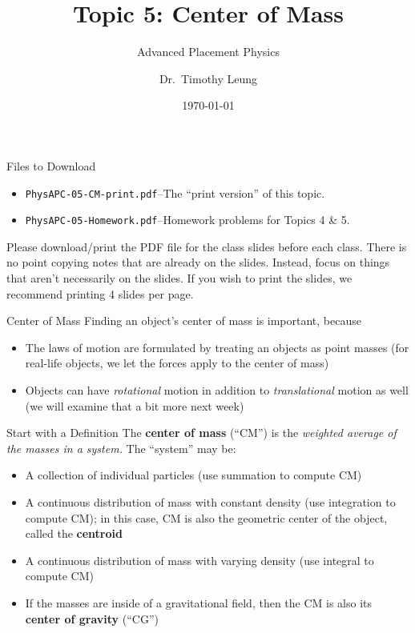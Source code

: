 \documentclass[12pt,compress,aspectratio=169]{beamer}
\title{Topic 5: Center of Mass}
\subtitle{Advanced Placement Physics}
\author[TML]{Dr.\ Timothy Leung}
\institute{Olympiads School}
\date{\today}
\begin{document}
\begin{frame}
  \maketitle
\end{frame}



\begin{frame}{Files to Download}
  \begin{itemize}
  \item\texttt{PhysAPC-05-CM-print.pdf}--The ``print version'' of this topic.
  \item\texttt{PhysAPC-05-Homework.pdf}--Homework problems for Topics 4 \& 5.
  \end{itemize}
  
  \vspace{.1in}Please download/print the PDF file for the class slides before
  each class. There is no point copying notes that are already on the slides.
  Instead, focus on things that aren't necessarily on the slides. If you wish
  to print the slides, we recommend printing 4 slides per page.
\end{frame}



\begin{frame}{Center of Mass}
  Finding an object's center of mass is important, because
  \begin{itemize}
  \item The laws of motion are formulated by treating an objects as point
    masses (for real-life objects, we let the forces apply to the center of
    mass)
  \item Objects can have \emph{rotational} motion in addition to
    \emph{translational} motion as well (we will examine that a bit more
    next week)
  \end{itemize}
\end{frame}



\begin{frame}{Start with a Definition}
  The \textbf{center of mass} (``CM'') is the
  \emph{weighted average of the masses in a system.} The ``system'' may be:
  \begin{itemize}
  \item A collection of individual particles (use summation to compute CM)
  \item A continuous distribution of mass with constant density (use
    integration to compute CM); in this case, CM is also the geometric center
    of the object, called the \textbf{centroid}
  \item A continuous distribution of mass with varying density (use integral to
    compute CM)
  \item If the masses are inside of a gravitational field, then the CM is also
    its \textbf{center of gravity} (``CG'')
  \end{itemize}
\end{frame}
\end{document}
